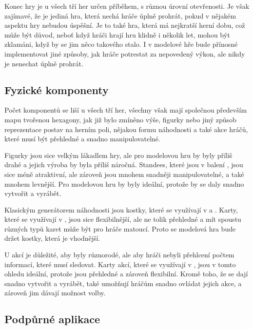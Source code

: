 Konec hry je u všech tří her určen příběhem, s různou úrovní otevřenosti. Je však zajímavé, že  je jediná hra, která nechá hráče úplně prohrát, pokud v nějakém aspektu hry nebudou úspěšní. Je to také hra, která má nejkratší herní dobu, což může být důvod, neboť když hráči hrají hru klidně i několik let, mohou být zklamáni, když by se jim něco takového stalo. I v modelové hře bude přínosné implementovat jiné způsoby, jak hráče potrestat za nepovedený výkon, ale nikdy je nenechat úplně prohrát.

\subsection{Fyzické komponenty}
\label{subsec:comparison_components}

Počet komponentů se liší u všech tří her, všechny však mají společnou především mapu tvořenou hexagony, jak již bylo zmíněno výše, figurky nebo jiný způsob reprezentace postav na herním poli, nějakou formu náhodnosti a také akce hráčů, které musí být přehledné a snadno manipulovatelné.

Figurky  jsou sice velkým lákadlem hry, ale pro modelovou hru by byly příliš drahé a jejich výroba by byla příliš náročná. Standees, které jsou v balení , jsou sice méně atraktivní, ale zároveň jsou mnohem snadněji manipulovatelné, a také mnohem levnější. Pro modelovou hru by byly ideální, protože by se daly snadno vytvořit a vyrábět.

Klasickým generátorem náhodnosti jsou kostky, které se využívají v \dnd{} a . Karty, které se využívají v , jsou sice flexibilnější, ale ne tolik přehledné a mít spoustu různých typů karet může být pro hráče matoucí. Proto se modelová hra bude držet kostky, která je vhodnější.

U akcí je důležité, aby byly různorodé, ale aby hráči nebyli přehlcení počtem informací, které musí sledovat. Karty akcí, které se využívají v , jsou v tomto ohledu ideální, protože jsou přehledné a zároveň flexibilní. Kromě toho, že se dají snadno vytvořit a vyrábět, také umožňují hráčům snadno ovládat jejich akce, a zároveň jim dávají možnost volby.

\subsection{Podpůrné aplikace}
\label{subsec:comparison_apps}


